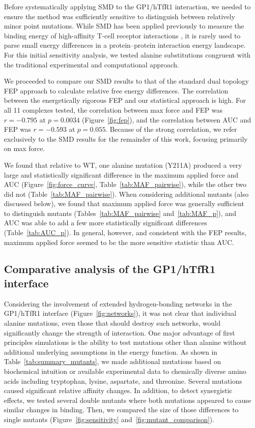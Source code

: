 \documentclass[12pt]{article}
\begin{document}
Before systematically applying SMD to the GP1/hTfR1 interaction, we needed to ensure the method was sufficiently sensitive to distinguish between relatively minor point mutations. While SMD has been applied previously to measure the binding energy of high-affinity T-cell receptor interactions \citep{Cuendet2008,Cuendet2011}, it is rarely used to parse small energy differences in a protein--protein interaction energy landscape. For this initial sensitivity analysis, we tested alanine substitutions congruent with the traditional experimental and computational approach. 

We proceeded to compare our SMD results to that of the standard dual topology FEP approach to calculate relative free energy differences. The correlation between the energetically rigorous FEP and our statistical approach is high. For all 11 complexes tested, the correlation between max force and FEP was $r=-0.795$ at $p=0.0034$ (Figure~\ref{fig:fep}), and the correlation between AUC and FEP was $r=-0.593$ at $p=0.055$. Because of the strong correlation, we refer exclusively to the SMD results for the remainder of this work, focusing primarily on max force.

We found that relative to WT, one alanine mutation (Y211A) produced a very large and statistically significant difference in the maximum applied force and AUC (Figure~\ref{fig:force_curve}, Table~\ref{tab:MAF_pairwise}), while the other two did not (Table~\ref{tab:MAF_pairwise}). When considering additional mutants (also discussed below), we found that maximum applied force was generally sufficient to distinguish mutants (Tables~\ref{tab:MAF_pairwise} and~\ref{tab:MAF_p}), and AUC was able to add a few more statistically significant differences (Table~\ref{tab:AUC_p}). In general, however, and consistent with the FEP results, maximum applied force seemed to be the more sensitive statistic than AUC.

\subsection{Comparative analysis of the GP1/hTfR1 interface}
Considering the involvement of extended hydrogen-bonding networks in the GP1/hTfR1 interface (Figure~\ref{fig:networks}), it was not clear that individual alanine mutations, even those that should destroy such networks, would significantly change the strength of interaction. One major advantage of first principles simulations is the ability to test mutations other than alanine without additional underlying assumptions in the energy function. As shown in Table~\ref{tab:summary_mutants}, we made additional mutations based on biochemical intuition or available experimental data to chemically diverse amino acids including tryptophan, lysine, aspartate, and threonine. Several mutations caused significant relative affinity changes. In addition, to detect synergistic effects, we tested several double mutants where both mutations appeared to cause similar changes in binding. Then, we compared the size of those differences to single mutants (Figure~\ref{fig:sensitivity} and~\ref{fig:mutant_comparison}).
\end{document}
